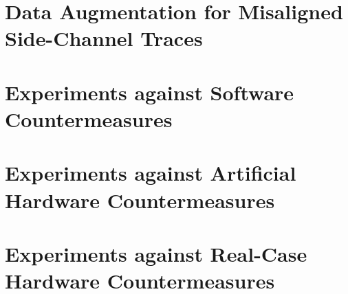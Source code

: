 \section{Data Augmentation for Misaligned Side-Channel Traces}

\section{Experiments against Software Countermeasures}



\section{Experiments against Artificial Hardware Countermeasures}


\section{Experiments against Real-Case Hardware Countermeasures}